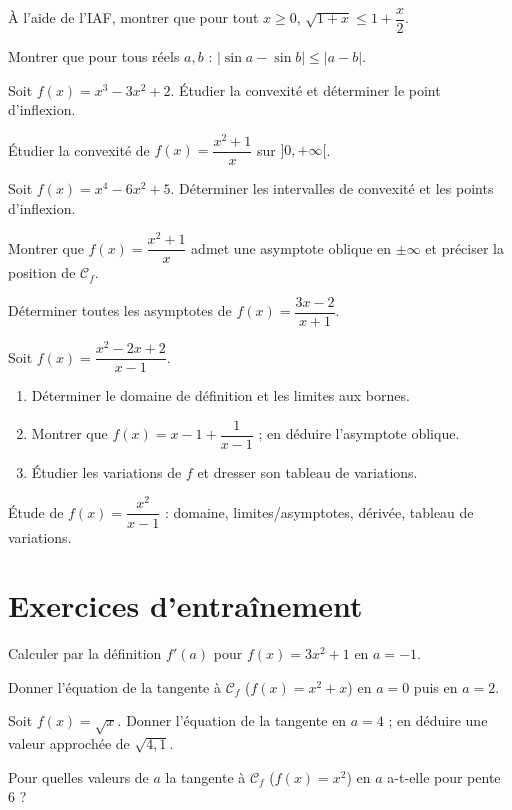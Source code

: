 \exo{} À l'aide de l'IAF, montrer que pour tout $x\ge0$, $\sqrt{1+x}\le 1+\dfrac{x}{2}$.

\exo{} Montrer que pour tous réels $a,b$ : $|\sin a-\sin b|\le|a-b|$.

\exo{} Soit $f(x)=x^{3}-3x^{2}+2$. Étudier la convexité et déterminer le point d'inflexion.

\exo{} Étudier la convexité de $f(x)=\dfrac{x^{2}+1}{x}$ sur $]0,+\infty[$.

\exo{} Soit $f(x)=x^{4}-6x^{2}+5$. Déterminer les intervalles de convexité et les points d'inflexion.

\exo{} Montrer que $f(x)=\dfrac{x^{2}+1}{x}$ admet une asymptote oblique en $\pm\infty$ et préciser la position de $\mathcal C_f$.

\exo{} Déterminer toutes les asymptotes de $f(x)=\dfrac{3x-2}{x+1}$.

\exo{} Soit $f(x)=\dfrac{x^{2}-2x+2}{x-1}$.
\begin{enumerate}[label=\arabic*)]
\item Déterminer le domaine de définition et les limites aux bornes.
\item Montrer que $f(x)=x-1+\dfrac{1}{x-1}$ ; en déduire l'asymptote oblique.
\item Étudier les variations de $f$ et dresser son tableau de variations.
\end{enumerate}

\exo{} Étude de $f(x)=\dfrac{x^{2}}{x-1}$ : domaine, limites/asymptotes, dérivée, tableau de variations.

\section{Exercices d'entraînement}

\exo{} Calculer par la définition $f'(a)$ pour $f(x)=3x^{2}+1$ en $a=-1$.

\exo{} Donner l'équation de la tangente à $\mathcal C_f$ ($f(x)=x^{2}+x$) en $a=0$ puis en $a=2$.

\exo{} Soit $f(x)=\sqrt{x}$. Donner l'équation de la tangente en $a=4$ ; en déduire une valeur approchée de $\sqrt{4{,}1}$.

\exo{} Pour quelles valeurs de $a$ la tangente à $\mathcal C_f$ ($f(x)=x^{2}$) en $a$ a-t-elle pour pente $6$ ?

